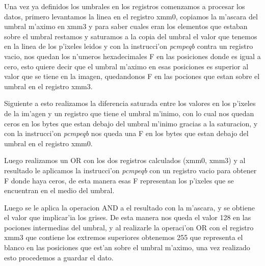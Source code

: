 Una vez ya definidos los umbrales en los registros comenzamos a procesar los datos, primero levantamos la linea 
en el registro xmm0, copiamos la m'ascara del umbral m'aximo en xmm3 y para saber cuales eran los elementos que estaban
sobre el umbral restamos y saturamos a la copia del umbral el valor que tenemos en la linea de los p'ixeles leidos y con 
la instrucci'on \textit{pcmpeqb} contra un registro vacio, nos quedan los n'umeros hexadecimales F en las posiciones donde es igual a cero, 
esto quiere decir que el umbral m'aximo en esas posiciones es superior al valor que se tiene en la imagen, quedandonos F 
en las pociones que estan sobre el umbral en el registro xmm3.

Siguiente a esto realizamos la diferencia saturada entre los valores en los p'ixeles de la im'agen y un registro que tiene 
el umbral m'inimo, con lo cual nos quedan ceros en los bytes que estan debajo del umbral m'inimo gracias a la saturacion,
y con la instrucci'on \textit{pcmpeqb} nos queda una F en los bytes que estan debajo del umbral en el registro xmm0.

Luego realizamos un OR con los dos registros calculados (xmm0, xmm3) y al resultado le aplicamos la instrucci'on \textit{pcmpeqb} con
un registro vacio para obtener F donde haya ceros, de esta manera esas F representan los p'ixeles que se encuentran en el 
medio del umbral.

Luego se le aplica la operacion AND a el resultado con la m'ascara, y se obtiene el valor que implicar'ia los grises.
De esta manera nos queda el valor 128 en las pociones intermedias del umbral, y al realizarle la operaci'on OR con el registro 
xmm3 que contiene los extremos superiores obtenemos 255 que representa el blanco en las posiciones que est'an sobre el umbral 
m'aximo, una vez realizado esto procedemos a guardar el dato.

